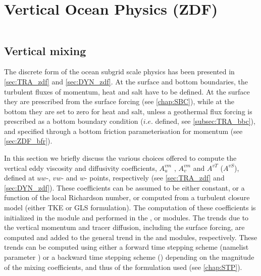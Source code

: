\documentclass[../tex_main/NEMO_manual]{subfiles}
\begin{document}
\chapter{Vertical Ocean Physics (ZDF)}
\label{chap:ZDF}
\minitoc



\newpage
$\ $\newline    %


\section{Vertical mixing}
\label{sec:ZDF_zdf}

The discrete form of the ocean subgrid scale physics has been presented in
\autoref{sec:TRA_zdf} and \autoref{sec:DYN_zdf}.
At the surface and bottom boundaries, the turbulent fluxes of momentum, heat and salt have to be defined.
At the surface they are prescribed from the surface forcing (see \autoref{chap:SBC}),
while at the bottom they are set to zero for heat and salt,
unless a geothermal flux forcing is prescribed as a bottom boundary condition ($i.e.$  defined,
see \autoref{subsec:TRA_bbc}), and specified through a bottom friction parameterisation for momentum
(see \autoref{sec:ZDF_bfr}).

In this section we briefly discuss the various choices offered to compute the vertical eddy viscosity and
diffusivity coefficients, $A_u^{vm}$ , $A_v^{vm}$ and $A^{vT}$ ($A^{vS}$), defined at $uw$-, $vw$- and $w$- points,
respectively (see \autoref{sec:TRA_zdf} and \autoref{sec:DYN_zdf}).
These coefficients can be assumed to be either constant, or a function of the local Richardson number,
or computed from a turbulent closure model (either TKE or GLS formulation).
The computation of these coefficients is initialized in the  module and performed in
the ,  or  modules.
The trends due to the vertical momentum and tracer diffusion, including the surface forcing,
are computed and added to the general trend in the  and  modules, respectively. 
These trends can be computed using either a forward time stepping scheme
(namelist parameter ) or a backward time stepping scheme
() depending on the magnitude of the mixing coefficients,
and thus of the formulation used (see \autoref{chap:STP}).
\end{document}
